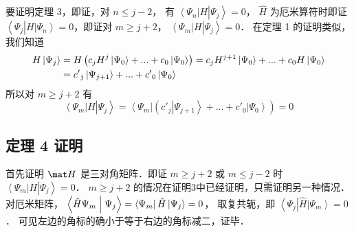要证明定理 3，即证，对 $n \leqslant j - 2$， 有 $\left\langle {\Psi_n} \right|H\left| {\Psi_j} \right\rangle  = 0$， $\hat H$ 为厄米算符时即证 $\left\langle {\Psi_j} \right|H\left| {\Psi_n} \right\rangle  = 0$，即证对 $m \geqslant j + 2$，  $\left\langle {\Psi_m} \right|H\left| {\Psi_j} \right\rangle  = 0$． 在定理 1 的证明类似，我们知道
\begin{equation}\begin{aligned}
  H\left| {\Psi_j} \right\rangle  &= H\left( {{c_j}{H^j}\left| {\Psi_0} \right\rangle  + ... + {c_0}\left| {\Psi_0} \right\rangle } \right) = {c_j}{H^{j + 1}}\left| {\Psi_0} \right\rangle  + ... + {c_0}H\left| {\Psi_0} \right\rangle \\
&= {{c'}_j}\left| {\Psi_{j + 1}} \right\rangle  + ... + {{c'}_0}\left| {\Psi_0} \right\rangle  \hfill \\ 
\end{aligned}\end{equation}
所以对 $m \geqslant j + 2$ 有
\begin{equation}
\left\langle {\Psi_m} \right|H\left| {\Psi_j} \right\rangle  = \left\langle {\Psi_m} \right|\left( {{{c'}_j}\left| {\Psi_{j + 1}} \right\rangle  + ... + {{c'}_0}\left| {\Psi_0} \right\rangle } \right) = 0
\end{equation}

\subsection{定理 4 证明}

首先证明 $\mat H$ 是三对角矩阵．即证 $m \geqslant j + 2$ 或 $m \leqslant j - 2$ 时 {$\left\langle {\Psi_m} \right|H\left| {\Psi_j} \right\rangle  = 0$．}
$m \geqslant j + 2$ 的情况在证明3中已经证明，只需证明另一种情况．
对厄米矩阵， $\left\langle {\hat H{\Psi_m}}
 \mathrel{\left | {\vphantom {{\hat H{\Psi_m}} {\Psi_j}}}
 \right. \kern-\nulldelimiterspace}
 {\Psi_j} \right\rangle  = \left\langle {\Psi_m} \right| \hat H\left| {\Psi_j} \right\rangle  = 0$， 取复共轭，即 $\left\langle {\Psi_j} \right|\hat H\left| {\Psi_m} \right\rangle  = 0$． 可见左边的角标的确小于等于右边的角标减二，证毕．

